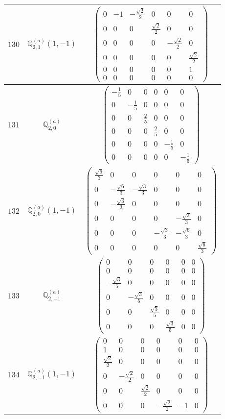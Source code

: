 \documentclass[fleqn,8pt,landscape]{jsarticle}
\begin{document}
\begin{center}
\begin{longtable}{ccc}
$ 130 $ & $ \mathbb{Q}_{2,1}^{(a)}(1,-1) $ & $ \begin{pmatrix} 0 & -1 & - \frac{\sqrt{2}}{2} & 0 & 0 & 0 \\ 0 & 0 & 0 & \frac{\sqrt{2}}{2} & 0 & 0 \\ 0 & 0 & 0 & 0 & - \frac{\sqrt{2}}{2} & 0 \\ 0 & 0 & 0 & 0 & 0 & \frac{\sqrt{2}}{2} \\ 0 & 0 & 0 & 0 & 0 & 1 \\ 0 & 0 & 0 & 0 & 0 & 0 \end{pmatrix} $ \\ \hline
$ 131 $ & $ \mathbb{Q}_{2,0}^{(a)} $ & $ \begin{pmatrix} - \frac{1}{5} & 0 & 0 & 0 & 0 & 0 \\ 0 & - \frac{1}{5} & 0 & 0 & 0 & 0 \\ 0 & 0 & \frac{2}{5} & 0 & 0 & 0 \\ 0 & 0 & 0 & \frac{2}{5} & 0 & 0 \\ 0 & 0 & 0 & 0 & - \frac{1}{5} & 0 \\ 0 & 0 & 0 & 0 & 0 & - \frac{1}{5} \end{pmatrix} $ \\ \hline
$ 132 $ & $ \mathbb{Q}_{2,0}^{(a)}(1,-1) $ & $ \begin{pmatrix} \frac{\sqrt{6}}{3} & 0 & 0 & 0 & 0 & 0 \\ 0 & - \frac{\sqrt{6}}{3} & - \frac{\sqrt{3}}{3} & 0 & 0 & 0 \\ 0 & - \frac{\sqrt{3}}{3} & 0 & 0 & 0 & 0 \\ 0 & 0 & 0 & 0 & - \frac{\sqrt{3}}{3} & 0 \\ 0 & 0 & 0 & - \frac{\sqrt{3}}{3} & - \frac{\sqrt{6}}{3} & 0 \\ 0 & 0 & 0 & 0 & 0 & \frac{\sqrt{6}}{3} \end{pmatrix} $ \\ \hline
$ 133 $ & $ \mathbb{Q}_{2,-1}^{(a)} $ & $ \begin{pmatrix} 0 & 0 & 0 & 0 & 0 & 0 \\ 0 & 0 & 0 & 0 & 0 & 0 \\ - \frac{\sqrt{3}}{5} & 0 & 0 & 0 & 0 & 0 \\ 0 & - \frac{\sqrt{3}}{5} & 0 & 0 & 0 & 0 \\ 0 & 0 & \frac{\sqrt{3}}{5} & 0 & 0 & 0 \\ 0 & 0 & 0 & \frac{\sqrt{3}}{5} & 0 & 0 \end{pmatrix} $ \\ \hline
$ 134 $ & $ \mathbb{Q}_{2,-1}^{(a)}(1,-1) $ & $ \begin{pmatrix} 0 & 0 & 0 & 0 & 0 & 0 \\ 1 & 0 & 0 & 0 & 0 & 0 \\ \frac{\sqrt{2}}{2} & 0 & 0 & 0 & 0 & 0 \\ 0 & - \frac{\sqrt{2}}{2} & 0 & 0 & 0 & 0 \\ 0 & 0 & \frac{\sqrt{2}}{2} & 0 & 0 & 0 \\ 0 & 0 & 0 & - \frac{\sqrt{2}}{2} & -1 & 0 \end{pmatrix} $ \\ \hline

\end{longtable}
\end{center}
\end{document}
